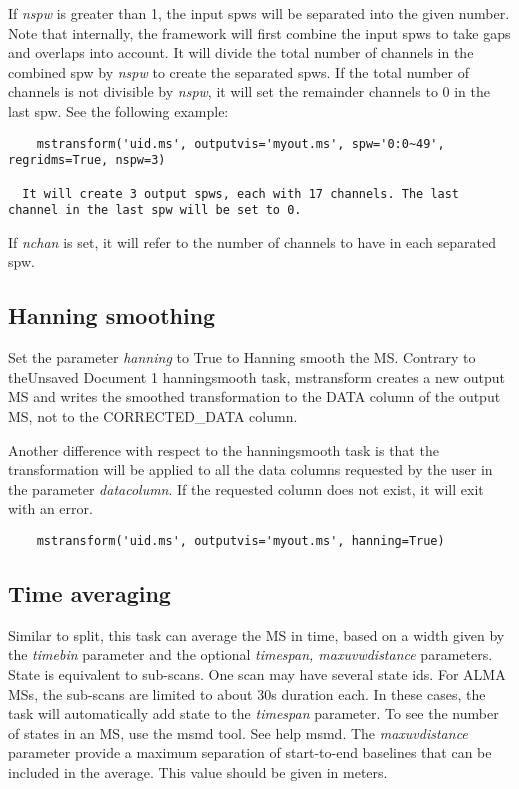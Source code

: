 If {\it nspw} is greater than 1, the input spws will be separated into the given
number. Note that internally, the framework will first combine the input
spws to take gaps and overlaps into account. It will divide the total number of
channels in the combined spw by {\it nspw} to create the separated spws. If the
total number of channels is not divisible by {\it nspw}, it will set the
remainder channels to 0 in the last spw. See the following example:

\begin{verbatim}
    mstransform('uid.ms', outputvis='myout.ms', spw='0:0~49', regridms=True, nspw=3)
  
  It will create 3 output spws, each with 17 channels. The last channel in the last spw will be set to 0.
\end{verbatim}

If {\it nchan} is set, it will refer to the number of channels to have in each
separated spw. 

\subsection{Hanning smoothing}
Set the parameter {\it hanning} to True to Hanning smooth the MS. Contrary to
theUnsaved Document 1 hanningsmooth task, mstransform creates a new output MS and writes the smoothed transformation
to the DATA column of the output MS, not to the CORRECTED_DATA column.

Another difference with respect to the hanningsmooth task is that the transformation will be 
applied to all the data columns requested by the user in the parameter {\it datacolumn}. If the 
requested column does not exist, it will exit with an error. 

\begin{verbatim}
    mstransform('uid.ms', outputvis='myout.ms', hanning=True)
\end{verbatim}

\subsection{Time averaging}
Similar to split, this task can average the MS in time, based on a width given by the
{\it timebin} parameter and the optional {\it timespan, maxuvwdistance}
parameters. State is equivalent to sub-scans. One scan may have several
state ids. For ALMA MSs, the sub-scans are limited to about 30s duration each.
In these cases, the task will automatically add state to the {\it timespan} 
parameter. To see the number of states in an MS, use the msmd tool. See help
msmd. The {\it maxuvdistance} parameter provide a maximum separation of
start-to-end baselines that can be included in the average. This value should be
given in meters.

